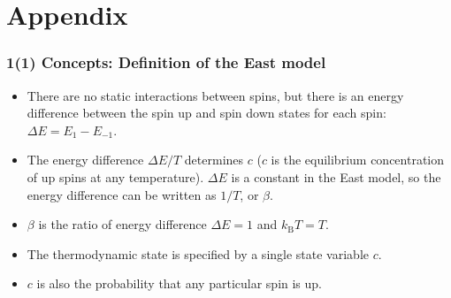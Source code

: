 \documentclass[8pt]{beamer}
\begin{document}
\section{Appendix}
\begin{frame}
	\frametitle{1(1) Concepts: Definition of the East model}
	\begin{itemize}
		\item There are no static interactions between spins, but there is an energy difference between the spin up and spin down states for each spin: $\Delta E= E_{1}- E_{-1}$.
		\item The energy difference $\Delta E/T$ determines $c$ ($c$ is the equilibrium concentration of up spins at any temperature). $\Delta E$ is a constant in the East model, so the energy difference can be written as $1/T$, or $\beta$. 
		\item $\beta$ is the ratio of energy difference $\Delta E=1$ and $k_\text{B}T=T$.
		\item The thermodynamic state is specified by a single state variable $c$.
		\item $c$ is also the probability that any particular spin is up.  
		
	\end{itemize}	
\end{frame}

		
\end{document}
